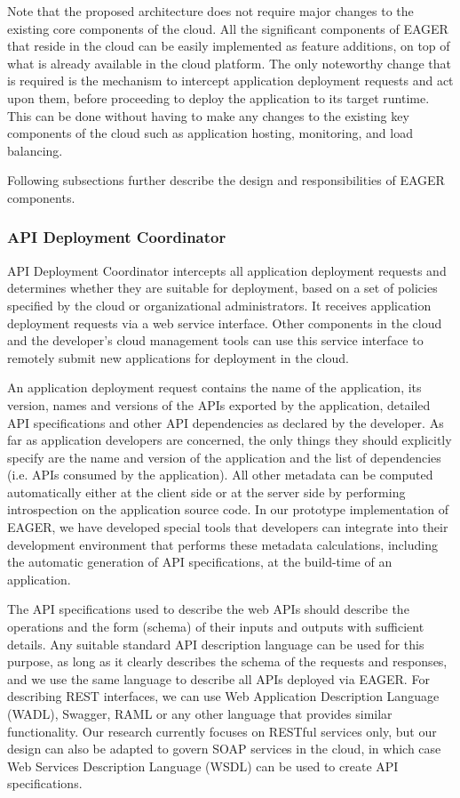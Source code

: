 Note that the proposed architecture does not require major changes to the existing core components of the cloud. All the 
significant components of EAGER that reside in the cloud can be easily implemented as feature additions, on top of what is already available 
in the cloud platform.
The only noteworthy change that is required is the mechanism to intercept application deployment requests and act upon them, before
proceeding to deploy the application to its target runtime. This can be done without having to make any changes to the existing key 
components of the cloud such as application hosting, monitoring, and load balancing.

Following subsections further describe the design and responsibilities of EAGER components.

\subsubsection{API Deployment Coordinator}
API Deployment Coordinator intercepts all application deployment requests and determines whether they are suitable for deployment, based
on a set of policies specified by the cloud or organizational administrators. It receives application deployment requests via a web service interface.
Other components in the cloud and the developer's cloud management tools can use this service interface to remotely submit new applications for
deployment in the cloud. 

An application deployment request contains the name of the application, its version, names and versions of the APIs
exported by the application, detailed API specifications and other API dependencies as declared by the developer. As far as application developers are
concerned, the only things they should explicitly specify are the name and version of the application and the list of dependencies (i.e. APIs consumed
by the application). All other metadata can be computed automatically either at the client side or at the server side by performing introspection on the
application source code. In our prototype implementation of EAGER, we have developed special tools that developers can integrate into their
development environment that performs these metadata calculations, including the automatic generation of API specifications, at the build-time
of an application.

The API specifications used to describe the web APIs should describe the operations and the form (schema) of their inputs and outputs with sufficient 
details. Any suitable standard API description language can be used for this purpose, as long as it clearly describes the schema of the requests and
responses, and we use the same language to describe all APIs deployed via EAGER. For describing REST interfaces, we can use Web Application
Description Language (WADL), Swagger, RAML or any other language that provides similar functionality. Our research currently focuses on RESTful 
services only, but our design can also be adapted to govern SOAP services in the cloud, in which case Web Services Description Language 
(WSDL) can be used to create API specifications.

